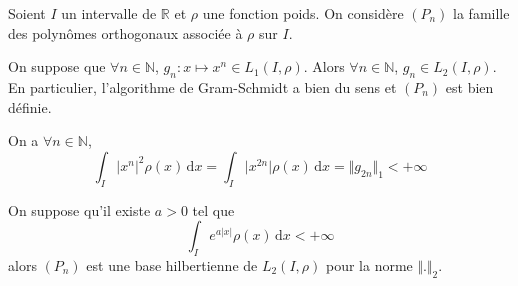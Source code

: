 


	
	
	
	Soient $I$ un intervalle de $\mathbb{R}$ et $\rho$ une fonction poids. On considère $(P_n)$ la famille des polynômes orthogonaux associée à $\rho$ sur $I$.
	
	\begin{lemma}
		\label{densite-des-polynomes-orthogonaux-1}
		On suppose que $\forall n \in \mathbb{N}$, $g_n : x \mapsto x^n \in L_1(I, \rho)$. Alors $\forall n \in \mathbb{N}$, $g_n \in L_2(I, \rho)$. En particulier, l'algorithme de Gram-Schmidt a bien du sens et $(P_n)$ est bien définie.
	\end{lemma}
	
	\begin{demonstration}
		On a $\forall n \in \mathbb{N}$,
		\[ \int_I \vert x^n \vert^2 \rho(x) \, \mathrm{d}x = \int_I \vert x^{2n} \vert \rho(x) \, \mathrm{d}x = \Vert g_{2n} \Vert_1 < +\infty \]
	\end{demonstration}
	
	\begin{theorem}
		On suppose qu'il existe $a > 0$ tel que
		\[ \int_I e^{a \vert x \vert} \rho(x) \, \mathrm{d}x < +\infty \]
		alors $(P_n)$ est une base hilbertienne de $L_2(I, \rho)$ pour la norme $\Vert . \Vert_2$.
	\end{theorem}
	
